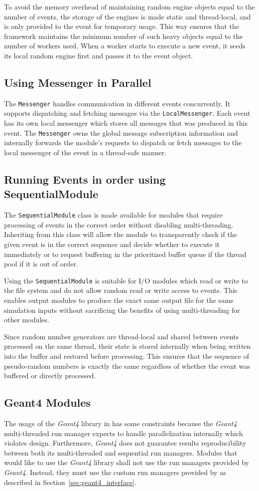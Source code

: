 To avoid the memory overhead of maintaining random engine objects equal to the number of events, the storage of the engines is made static and thread-local, and is only provided to the event for temporary usage.
This way ensures that the framework maintains the minimum number of such heavy objects equal to the number of workers used.
When a worker starts to execute a new event, it seeds its local random engine first and passes it to the event object.

\subsection{Using Messenger in Parallel}
The \texttt{Messenger} handles communication in different events concurrently. It supports dispatching and fetching messages via the \texttt{LocalMessenger}.
Each event has its own local messenger which stores all messages that was produced in this event.
The \texttt{Messenger} owns the global message subscription information and internally forwards the module's requests to dispatch or fetch messages to the local messenger of the event in a thread-safe manner.

\subsection{Running Events in order using SequentialModule}
The \texttt{SequentialModule} class is made available for modules that require processing of events in the correct order without disabling multi-threading.
Inheriting from this class will allow the module to transparently check if the given event is in the correct sequence and decide whether to execute it immediately or to request buffering in the prioritized buffer queue if the thread pool if it is out of order.

Using the \texttt{SequentialModule} is suitable for I/O modules which read or write to the file system and do not allow random read or write access to events.
This enables output modules to produce the exact same output file for the same simulation inputs without sacrificing the benefits of using multi-threading for other modules.

Since random number generators are thread-local and shared between events processed on the same thread, their state is stored internally when being written into the buffer and restored before processing.
This ensures that the sequence of pseudo-random numbers is exactly the same regardless of whether the event was buffered or directly processed.

\subsection{Geant4 Modules}
The usage of the \emph{Geant4} library in \apsq has some constraints because the \emph{Geant4} multi-threaded run manager expects to handle parallelization internally which violates \apsq design.
Furthermore, \emph{Geant4} does not guarantee results reproducibility between both its multi-threaded and sequential run managers.
Modules that would like to use the \emph{Geant4} library shall not use the run managers provided by \emph{Geant4}.
Instead, they must use the custom run managers provided by \apsq as described in Section~\ref{sec:geant4_interface}.
